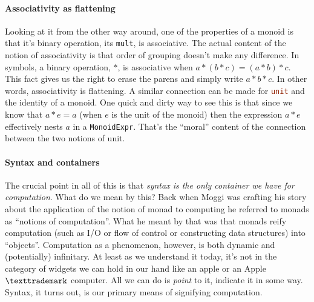 \paragraph{Associativity as flattening}
Looking at it from the other way around, one of the properties of a
monoid is that it's binary operation, its
\lstinline[language=Scala]!mult!, is associative. The actual content of
the notion of associativity is that order of grouping doesn't make any
difference. In symbols, a binary operation, $*$, is associative when
$a*(b*c) = (a*b)*c$. This fact gives us the right to erase the parens
and simply write $a*b*c$. In other words, associativity is
flattening. A similar connection can be made for
\lstinline[language=Scala]!unit! and the identity of a monoid. One
quick and dirty way to see this is that since we know that $a*e=a$
(when $e$ is the unit of the monoid) then the expression $a*e$
effectively nests $a$ in a
\lstinline[language=Scala]!MonoidExpr!. That's the ``moral'' content
of the connection between the two notions of unit.

\paragraph{Syntax and containers}
The crucial point in all of this is that \emph{syntax is the only
  container we have for computation}. What do we mean by this? Back
when Moggi was crafting his story about the application of the notion
of monad to computing he referred to monads as ``notions of
computation''. What he meant by that was that monads reify computation
(such as I/O or flow of control or constructing data structures) into
``objects''. Computation as a phenomenon, however, is both dynamic and
(potentially) infinitary. At least as we understand it today, it's not
in the category of widgets we can hold in our hand like an apple or an
Apple $\texttrademark$ computer. All we can do is \emph{point} to it,
indicate it in some way. Syntax, it turns out, is our primary means of
signifying computation. 

